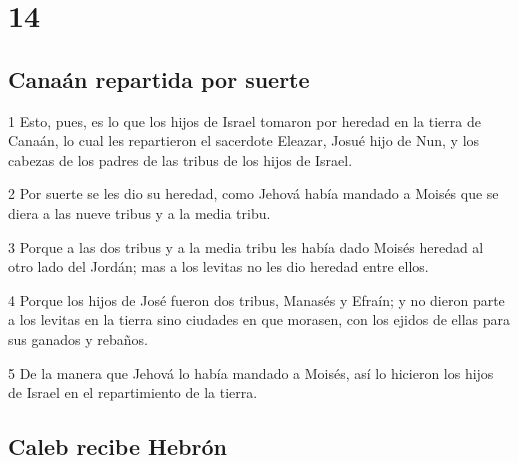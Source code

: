 \chapter{14}

\section*{Canaán repartida por suerte}

\par 1 Esto, pues, es lo que los hijos de Israel tomaron por heredad en la tierra de Canaán, lo cual les repartieron el sacerdote Eleazar, Josué hijo de Nun, y los cabezas de los padres de las tribus de los hijos de Israel.
\par 2 Por suerte se les dio su heredad, como Jehová había mandado a Moisés que se diera a las nueve tribus y a la media tribu. 
\par 3 Porque a las dos tribus y a la media tribu les había dado Moisés heredad al otro lado del Jordán; mas a los levitas no les dio heredad entre ellos.
\par 4 Porque los hijos de José fueron dos tribus, Manasés y Efraín; y no dieron parte a los levitas en la tierra sino ciudades en que morasen, con los ejidos de ellas para sus ganados y rebaños.
\par 5 De la manera que Jehová lo había mandado a Moisés, así lo hicieron los hijos de Israel en el repartimiento de la tierra.
\section*{Caleb recibe Hebrón}

